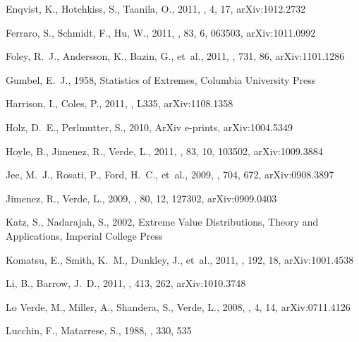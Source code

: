 \documentclass[twocolumn,useAMS,usenatbib,usegraphicx]{mn2e}
\begin{document}
\begin{thebibliography}{37}
{Enqvist}, K., {Hotchkiss}, S., {Taanila}, O., 2011, \jcap, 4, 17, \eprint
  arXiv:{1012.2732}

{Ferraro}, S., {Schmidt}, F., {Hu}, W., 2011, \prd, 83, 6, 063503, \eprint
  arXiv:{1011.0992}

{Foley}, R.~J., {Andersson}, K., {Bazin}, G., et~al., 2011, \apj, 731, 86,
  \eprint arXiv:{1101.1286}

Gumbel, E.~J., 1958, Statistics of Extremes, Columbia University Press

{Harrison}, I., {Coles}, P., 2011, \mnras, L335, \eprint arXiv:{1108.1358}

{Holz}, D.~E., {Perlmutter}, S., 2010, ArXiv e-prints, \eprint
  arXiv:{1004.5349}

{Hoyle}, B., {Jimenez}, R., {Verde}, L., 2011, \prd, 83, 10, 103502, \eprint
  arXiv:{1009.3884}

{Jee}, M.~J., {Rosati}, P., {Ford}, H.~C., et~al., 2009, \apj, 704, 672,
  \eprint arXiv:{0908.3897}

{Jimenez}, R., {Verde}, L., 2009, \prd, 80, 12, 127302, \eprint
  arXiv:{0909.0403}

Katz, S., Nadarajah, S., 2002, Extreme Value Distributions, Theory and
  Applications, Imperial College Press

{Komatsu}, E., {Smith}, K.~M., {Dunkley}, J., et~al., 2011, \apjs, 192, 18,
  \eprint arXiv:{1001.4538}

{Li}, B., {Barrow}, J.~D., 2011, \mnras, 413, 262, \eprint arXiv:{1010.3748}

{Lo Verde}, M., {Miller}, A., {Shandera}, S., {Verde}, L., 2008, \jcap, 4, 14,
  \eprint arXiv:{0711.4126}

{Lucchin}, F., {Matarrese}, S., 1988, \apj, 330, 535


\end{thebibliography}
\end{document}
